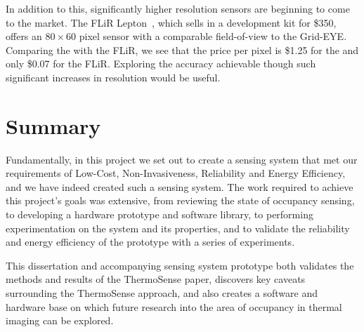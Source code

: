 \documentclass[../thesis/thesis.tex]{subfiles}
\begin{document}
In addition to this, significantly higher resolution sensors are beginning to come to the market. The FLiR Lepton~\cite{flir}, which sells in a development kit for \$350, offers an $80 \times 60$ pixel sensor with a comparable field-of-view to the Grid-EYE. Comparing the \mlx with the FLiR, we see that the price per pixel is \$1.25 for the \mlx and only \$0.07 for the FLiR. Exploring the accuracy achievable though such significant increases in resolution would be useful.

\section{Summary}
Fundamentally, in this project we set out to create a sensing system that met our requirements of Low-Cost, Non-Invasiveness, Reliability and Energy Efficiency, and we have indeed created such a sensing system. The work required to achieve this project's goals was extensive, from reviewing the state of occupancy sensing, to developing a hardware prototype and software library, to performing experimentation on the system and its properties, and to validate the reliability and energy efficiency of the prototype with a series of experiments.

This dissertation and accompanying sensing system prototype both validates the methods and results of the ThermoSense paper, discovers key caveats surrounding the ThermoSense approach, and also creates a software and hardware base on which future research into the area of occupancy in thermal imaging can be explored.
 
\end{document}
